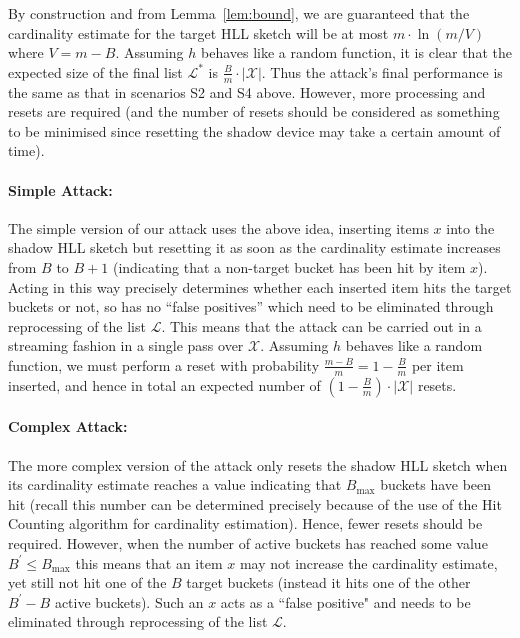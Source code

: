\documentclass[sigconf, anonymous, dvipsnames]{acmart} %
\begin{document}
By construction and from Lemma~\ref{lem:bound}, we are guaranteed that the cardinality estimate for the target HLL sketch will be at most $m \cdot \ln (m/V)$ where $V = m-B$. Assuming $h$ behaves like a random function, it is clear that the expected size of the final list ${\mathcal{L}}^*$ is $\frac{B}{m}\cdot |{\mathcal{X}}|$. Thus the attack's final performance is the same as that in scenarios S2 and S4 above. However, more processing and resets are required (and the number of resets should be considered as something to be minimised since resetting the shadow device may take a certain amount of time). 

\paragraph{Simple Attack:}
The simple version of our attack uses the above idea, inserting items $x$ into the shadow HLL sketch but resetting it as soon as the cardinality estimate increases from $B$ to $B+1$ (indicating that a non-target bucket has been hit by item $x$). Acting in this way precisely determines whether each inserted item hits the target buckets or not, so has no ``false positives'' which need to be eliminated through reprocessing of the list ${\mathcal{L}}$. This means that the attack can be carried out in a streaming fashion in a single pass over ${\mathcal{X}}$. Assuming $h$ behaves like a random function, we must perform a reset with probability $\frac{m-B}{m} = 1 - \frac{B}{m}$ per item inserted, and hence in total an expected number of $(1 - \frac{B}{m})\cdot | \mathcal{X} |$ resets.

\paragraph{Complex Attack:}
The more complex version of the attack only resets the shadow HLL sketch when its cardinality estimate reaches a value indicating that $B_{\max}$ buckets have been hit (recall this number can be determined precisely because of the use of the Hit Counting algorithm for cardinality estimation). Hence, fewer resets should be required. However, when the number of active buckets has reached some value $B^\prime \leq B_{\max}$ this means that an item $x$ may not increase the cardinality estimate, yet still not hit one of the $B$ target buckets (instead it hits one of the other $B^\prime - B$ active buckets). Such an $x$ acts as a ``false positive" and needs to be eliminated through reprocessing of the list ${\mathcal{L}}$.
\end{document}
